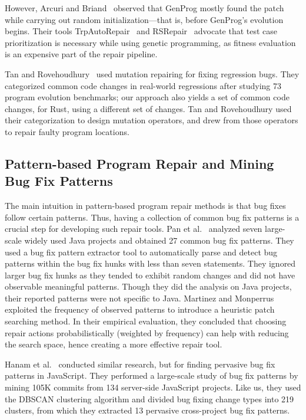 However, Arcuri and Briand~\cite{arcuri2011practical} observed that GenProg mostly found the patch while carrying out random initialization---that is, before GenProg's evolution begins. Their tools TrpAutoRepair~\cite{qi2013efficient} and RSRepair~\cite{qi2014strength} advocate that test case prioritization is necessary while using genetic programming, as fitness evaluation is an expensive part of the repair pipeline.

Tan and Rovehoudhury~\cite{tan2015relifix} used mutation repairing for fixing regression bugs. They categorized common code changes in real-world regressions after studying 73 program evolution benchmarks; our approach also yields a set of common code changes, for Rust, using a different set of changes. Tan and Rovehoudhury used their categorization to design mutation operators, and drew from those operators to repair faulty program locations.

\subsection{Pattern-based Program Repair and Mining Bug Fix Patterns}

The main intuition in pattern-based program repair methods is that bug fixes follow certain patterns. Thus, having a collection of common bug fix patterns is a crucial step for developing such repair tools. Pan et al.~\cite{pan2009toward} analyzed seven large-scale widely used Java projects and obtained 27 common bug fix patterns. They used a bug fix pattern extractor tool to automatically parse and detect bug patterns within the bug fix hunks with less than seven statements. They ignored larger bug fix hunks as they tended to exhibit random changes and did not have observable meaningful patterns. Though they did the analysis on Java projects, their reported patterns were not specific to Java. Martinez and Monperrus~\cite{martinez2015mining,martinez2012mining} exploited the frequency of observed patterns to introduce a heuristic patch searching method. In their empirical evaluation, they concluded that choosing repair actions probabilistically (weighted by frequency) can help with reducing the search space, hence creating a more effective repair tool.

Hanam et al.~\cite{hanam2016discovering} conducted similar research, but for finding pervasive bug fix patterns in JavaScript. They performed a large-scale study of bug fix patterns by mining 105K commits from 134 server-side JavaScript projects. Like us, they used the DBSCAN clustering algorithm and divided bug fixing change types into 219 clusters, from which they extracted 13 pervasive cross-project bug fix patterns. 

